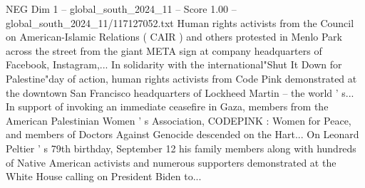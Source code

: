 \begin{textsample}{NEG Dim 1 – global\_south\_2024\_11 – Score 1.00 – global\_south\_2024\_11/117127052.txt}
Human rights activists from the Council on American-Islamic Relations ( CAIR ) and others protested in Menlo Park across the street from the giant META sign at company headquarters of Facebook, Instagram,...
In solidarity with the international"Shut It Down for Palestine"day of action, human rights activists from Code Pink demonstrated at the downtown San Francisco headquarters of Lockheed Martin -- the world ' s...
In support of invoking an immediate ceasefire in Gaza, members from the American Palestinian Women ' s Association, CODEPINK : Women for Peace, and members of Doctors Against Genocide descended on the Hart...
On Leonard Peltier ' s 79th birthday, September 12 his family members along with hundreds of Native American activists and numerous supporters demonstrated at the White House calling on President Biden to...

\end{textsample}
